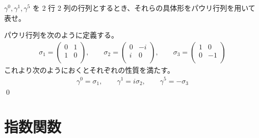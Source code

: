 \documentclass[uplatex,dvipdfmx,a4paper,11pt]{jlreq}
\makeatletter
\numberwithin{equation}{section}
\theoremstyle{definition}
\renewenvironment{proof}[1][\proofname]{\par
  \normalfont
  \topsep6\p@\@plus6\p@ \trivlist
  \item[\hskip\labelsep{\bfseries #1}\@addpunct{\bfseries}]\ignorespaces\quad\par
}{%
  \qed\endtrivlist\@endpefalse
}
\renewcommand\proofname{証明}
\makeatother
\begin{document}
\begin{problem}
$\gamma^0, \gamma^1, \gamma^5$ を 2 行 2 列の行列とするとき、それらの具体形をパウリ行列を用いて表せ。
\end{problem}
\begin{proof}
  パウリ行列を次のように定義する。
  \begin{align}
    \sigma_1 = \begin{pmatrix}
                 0 & 1 \\
                 1 & 0 \\
               \end{pmatrix}, \qquad
    \sigma_2 = \begin{pmatrix}
                 0 & -i \\
                 i & 0  \\
               \end{pmatrix}, \qquad
    \sigma_3 = \begin{pmatrix}
                 1 & 0  \\
                 0 & -1 \\
               \end{pmatrix}
  \end{align}
  これより次のようにおくとそれぞれの性質を満たす。
  \begin{align}
    \gamma^0 = \sigma_1, \qquad \gamma^1 = i\sigma_2, \qquad \gamma^5 = -\sigma_3
  \end{align}
\end{proof}

\section{指数関数}
\end{document}
